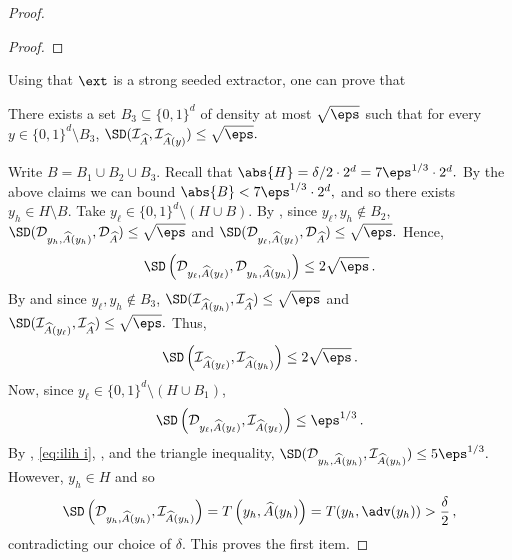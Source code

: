 \begin{proof}
\begin{proof}
	\end{proof}
	Using that $\ext$ is a strong seeded extractor, one can prove that
	\begin{claim}\label{claim:i is concentrated i}
		There exists a set
		$B_3 \subseteq \{0,1\}^d$ of density at most $\sqrt{\eps}$ such that for every $y \in \{0,1\}^d \setminus B_3$,
		$
		\SD(\mathcal{I}_{\widehat{A}}, \mathcal{I}_{\widehat{A}(y)}) \le \sqrt{\eps}.
		$
	\end{claim}
	
	Write $B = B_1 \cup B_2 \cup B_3$. Recall that 
	$\abs{H} = \delta/2\cdot 2^d = 7\eps^{1/3} \cdot 2^d.$ 
	By the above claims we can bound
	$
	\abs{B} < 7\eps^{1/3} \cdot 2^d,
	$
	and so there exists $y_h \in H \setminus B$.  Take $y_\ell \in \{0,1\}^d \setminus (H \cup B)$. 	
	By , since $y_\ell,y_h \notin B_2$,
	$\SD(\mathcal{D}_{y_h,\widehat{A}(y_h)}, \mathcal{D}_{\widehat{A}} ) \le \sqrt{\eps}$ and
	$\SD(\mathcal{D}_{y_\ell,\widehat{A}(y_\ell)}, \mathcal{D}_{\widehat{A}} ) \le \sqrt{\eps}.
	$
	Hence,
	\begin{equation}\label{eq:dldh i}
	\SD\left(\mathcal{D}_{y_\ell,\widehat{A}(y_\ell)}, \mathcal{D}_{y_h,\widehat{A}(y_h)}\right) \le 2\sqrt{\eps}\,.
	\end{equation}
	By  and since $y_\ell,y_h \notin B_3$,
 	$
	\SD(\mathcal{I}_{\widehat{A}(y_h)}, \mathcal{I}_{\widehat{A}} ) \le \sqrt{\eps}$ and
	$\SD(\mathcal{I}_{\widehat{A}(y_\ell)}, \mathcal{I}_{\widehat{A}} ) \le \sqrt{\eps}.
$
	Thus,
	\begin{equation}\label{eq:ilih i}
	\SD\left(\mathcal{I}_{\widehat{A}(y_\ell)}, \mathcal{I}_{\widehat{A}(y_h)} \right) \le 2\sqrt{\eps}\,.
	\end{equation}
	Now, since $y_\ell \in \{0,1\}^d \setminus (H \cup B_1)$,
	\begin{equation}\label{eq:dlil i}
	\SD\left(\mathcal{D}_{y_\ell,\widehat{A}(y_\ell)}, \mathcal{I}_{\widehat{A}(y_\ell)}\right) \le \eps^{1/3}\,.
	\end{equation}
%
 By , \eqref{eq:ilih i}, , %
and the triangle inequality,
	$
	\SD(\mathcal{D}_{y_h,\widehat{A}(y_h)}, \mathcal{I}_{\widehat{A}(y_h)}) \le 5 \eps^{1/3}.
	$
	However, $y_h \in H$ and so
	\begin{align*}
	\SD\left( \mathcal{D}_{y_h,\widehat{A}(y_h)}, \mathcal{I}_{\widehat{A}(y_h)} \right) = T\left(y_h,\widehat{A}(y_h)\right) 
	= T(y_h, \adv(y_h)) > \frac{\delta}{2}\,,
	\end{align*}
	contradicting our choice of $\delta$. This proves the first item.
	

\end{proof}
